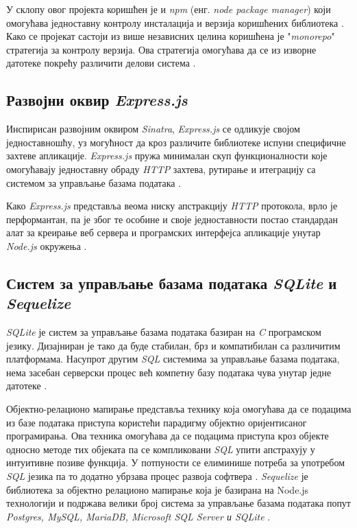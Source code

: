 \documentclass[12pt,oneside]{memoir}
\begin{document}
У склопу овог пројекта коришћен је и \textit{npm} (енг. \textit{node package manager}) који омогућава једноставну контролу инсталација и верзија коришћених библиотека \cite{npm}. Како се пројекат састоји из више независних целина коришћена је "\textit{monorepo}" стратегија за контролу верзија. Ова стратегија омогућава да се из изворне датотеке покрећу различити делови система \cite{monorepo}.

\subsection{Развојни оквир \textit{Express.js}}

Инспирисан развојним оквиром \textit{Sinatra}, \textit{Express.js} се одликује својом једноставношћу, уз могућност да кроз различите библиотеке испуни специфичне захтеве апликације. \textit{Express.js} пружа минималан скуп функционалности које омогућавају једноставну обраду \textit{HTTP} захтева, рутирање и итеграцију са системом за управљање базама података \cite{express}. 

Како \textit{Express.js} представља веома ниску апстракцију \textit{HTTP} протокола, врло је перформантан, па је због те особине и своје једноставности постао стандардан алат за креирање веб сервера и програмских интерфејса апликације унутар \textit{Node.js }окружења \cite{mdnexpress}.

\subsection{Систем за управљање базама података \textit{SQLite} и \textit{Sequelize}}

\textit{SQLite} је систем за управљање базама података базиран на \textit{C} програмском језику. Дизајниран је тако да буде стабилан, брз и компатибилан са различитим платформама.  Насупрот другим \textit{SQL} системима за управљање базама података, нема засебан серверски процес већ компетну базу података чува унутар једне датотеке \cite{sqlite} \cite{sqlitetutorial}.

Објектно-релационо мапирање представља технику која омогућава да се подацима из базе података приступа користећи парадигму објектно оријентисаног програмирања. Ова техника омогућава да се подацима приступа кроз објекте односно методе тих објеката па се компликовани \textit{SQL} упити апстрахују у интуитивне позиве функција. У потпуности се елиминише потреба за употребом \textit{SQL} језика па то додатно убрзава процес развоја софтвера \cite{orm}. \textit{Sequelize} је библиотека за објектно релационо мапирање која је базирана на Node.js технологији и подржава велики број система за управљање базама података попут \textit{Postgres, MySQL, MariaDB, Microsoft SQL Server и SQLite} \cite{sequelize}.
\end{document}
